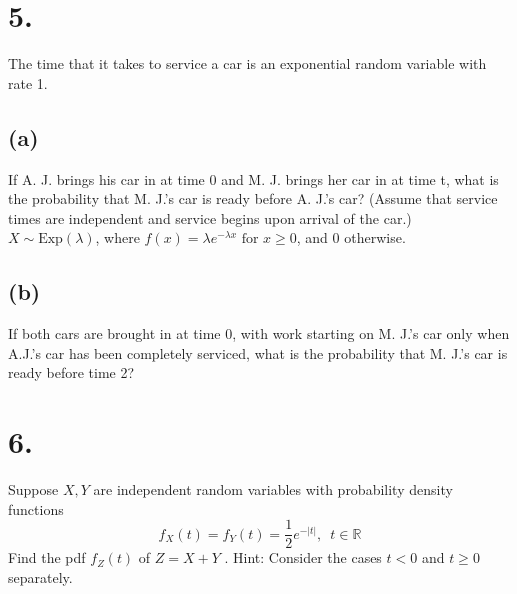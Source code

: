 \documentclass{article}
\begin{document}
\section*{5.}
{\Large 
The time that it takes to service a car is an exponential random variable with rate 1.

\subsection*{(a)}
If A. J. brings his car in at time 0 and M. J. brings her car in at time t, what is the
probability that M. J.’s car is ready before A. J.’s car? (Assume that service times are
independent and service begins upon arrival of the car.) \\
$X \sim \text{Exp}(\lambda)$, where $f(x) = \lambda e^{-\lambda x} \text{ for } x \geq 0$, and 0 otherwise.


\subsection*{(b)}
If both cars are brought in at time 0, with work starting on M. J.’s car only when A.J.’s
car has been completely serviced, what is the probability that M. J.’s car is ready before
time 2?


}

\section*{6.}
{\Large 
Suppose  $X, Y$  are independent random variables with probability density functions
\[f_X (t) = f_Y (t) =\frac12e^{-|t|}, \,\,\, t \in \mathbb R\]
Find the pdf $f_Z (t)$ of $Z = X + Y$ . Hint: Consider the cases $t < 0$ and $t \ge 0$ separately.


}
\end{document}
